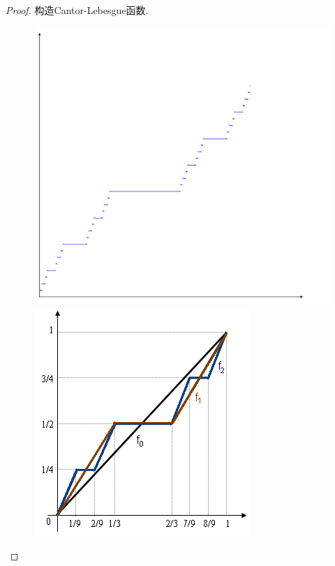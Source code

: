 \documentclass[hyperref,a4paper,UTF8]{ctexart}
\begin{document}
\begin{proof}
构造Cantor-Lebesgue函数. 
\begin{figure}[htbp]
  \centering
  \begin{minipage}{0.3\textwidth}
      \centering
      \includegraphics[width=\textwidth]{image/cantor_lebesgue.png}
  \end{minipage}
  \begin{minipage}{0.3\textwidth}
      \centering
      \includegraphics[width=\textwidth]{image/Cantor_function_sequence.png}

\end{minipage}
\end{figure}
\end{proof}
\end{document}
